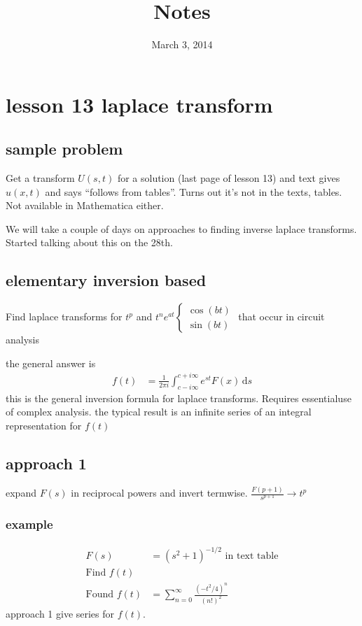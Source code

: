 \documentclass{article}
\begin{document}
\title{Notes}
\date{March 3, 2014}
\maketitle

\section*{lesson 13 laplace transform}
\subsection*{sample problem}
Get a transform $U(s,t)$ for a solution (last page of lesson 13) and text gives $u(x,t)$ and says ``follows from tables''. Turns out it's not in the texts, tables. Not available in Mathematica either.

We will take a couple of days on approaches to finding inverse laplace transforms. Started talking about this on the 28th.
\subsection*{elementary inversion based}
Find laplace transforms for $t^p$ and $t^ne^{at}\begin{cases}\cos(bt)\\\sin(bt)\end{cases}$ that occur in circuit analysis

the general answer is
\begin{align*}
  f(t)&=\frac{1}{2\pi i}\int_{c-i\infty}^{c+i\infty}{e^{st}F(x)\,\mathrm{d}s}
\end{align*}
this is the general inversion formula for laplace transforms. Requires essentialuse of complex analysis. the typical result is an infinite series of an integral representation for $f(t)$
\subsection*{approach 1}
expand $F(s)$ in reciprocal powers and invert termwise. $\frac{F(p+1)}{s^{p+1}}\to t^p$
\subsubsection*{example}
\begin{align*}
  F(s)&=(s^2+1)^{-1/2} \text{ in text table}\\
  \text{Find }f(t)\\
  \text{Found }f(t)&=\sum\limits_{n=0}^\infty{\frac{(-t^2/4)^n}{(n!)^2}}
\end{align*}
approach 1 give series for $f(t)$.
\end{document}
